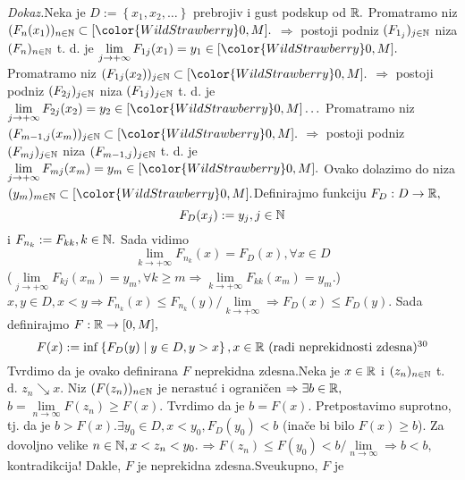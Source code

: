 \documentclass{article}
\begin{document}
\textit{Dokaz.}\newline Neka je \(D:=\left\{x_1,x_2,\ldots\right\}\) prebrojiv i gust podskup od \(\Bbb R.\) Promatramo niz \((F_n(x_1))_{n\in\Bbb N}\subset[{\color{WildStrawberry}0},M].\) \(\Rightarrow\) postoji podniz \((F_{1_j})_{j\in\Bbb N}\) niza \((F_n)_{n\in\Bbb N}\) t. d. je \(\lim\limits_{j\to+\infty}F_{1j}(x_1)=y_1\in[{\color{WildStrawberry}0},M].\) Promatramo niz \((F_{1j}(x_2))_{j\in\Bbb N}\subset[{\color{WildStrawberry}0},M].\) \(\Rightarrow\) postoji podniz \((F_{2j})_{j\in\Bbb N}\) niza \((F_{1j})_{j\in\Bbb N}\) t. d. je \(\lim\limits_{j\to+\infty}F_{2j}(x_2)=y_2\in[{\color{WildStrawberry}0},M]\ldots\) Promatramo niz \((F_{m-1,j}(x_m))_{j\in\Bbb N}\subset[{\color{WildStrawberry}0},M].\) \(\Rightarrow\) postoji podniz \((F_{mj})_{j\in\Bbb N}\) niza \((F_{m-1,j})_{j\in\Bbb N}\) t. d. je \(\lim\limits_{j\to+\infty}F_{mj}(x_m)=y_m\in[{\color{WildStrawberry}0},M].\) Ovako dolazimo do niza \((y_m)_{m\in\Bbb N}\subset[{\color{WildStrawberry}0},M].\)\newline Definirajmo funkciju \(F_D:D\to\Bbb R,\) \[F_D(x_j):=y_j,j\in\Bbb N\] i \(F_{n_k}:=F_{kk},k\in\Bbb N.\) Sada vidimo \[\lim_{k\to+\infty}F_{n_k}(x)=F_D(x),\forall x\in D\] (\(\lim\limits_{j\to+\infty}F_{kj}(x_m)=y_m,\forall k\ge m\Rightarrow\lim\limits_{k\to+\infty}F_{kk}(x_m)=y_m.\))\newline \(x,y\in D,x<y\Rightarrow F_{n_k}(x)\le F_{n_k}(y)/\lim\limits_{k\to+\infty}\Rightarrow\boxed{F_D(x)\le F_D(y)}.\) Sada definirajmo \(F:\Bbb R\to[0,M],\) \[F(x):=\inf\left\{F_D(y)\mid y\in D,y>x\right\},x\in\Bbb R\text{ (radi neprekidnosti zdesna)}\footnotemark[30]\]\newline Tvrdimo da je ovako definirana \(F\) neprekidna zdesna.\newline Neka je \(x\in\Bbb R\) i \((z_n)_{n\in\Bbb N}\) t. d. \(z_n\searrow x.\) Niz \((F(z_n))_{n\in\Bbb N}\) je nerastuć i ograničen \(\Rightarrow\exists b\in\Bbb R,\)\newline\(b=\lim\limits_{n\to\infty}F(z_n)\ge F(x).\) Tvrdimo da je \(b=F(x).\) Pretpostavimo suprotno, tj. da je \(b>F(x).\)\newline \(\exists y_0\in D,x<y_0, F_D(y_0)<b\) (inače bi bilo \(F(x)\ge b\)).  Za dovoljno velike \(n\in\Bbb N, x<z_n<y_0.\)\newline\(\Rightarrow F(z_n)\le F(y_0)<b/\lim\limits_{n\to\infty}\Rightarrow b<b,\) kontradikcija! Dakle, \(F\) je neprekidna zdesna.\newline Sveukupno, \(F\) je
\end{document}
